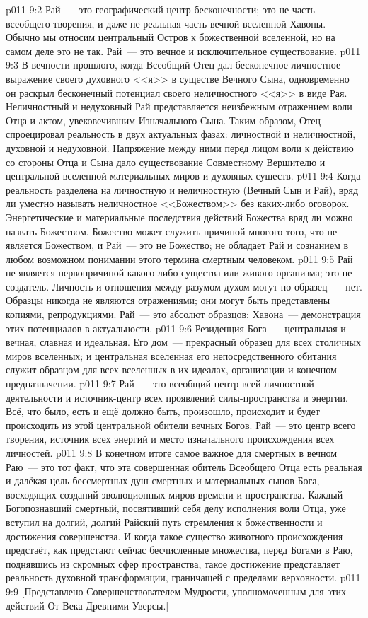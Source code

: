\vs p011 9:2 \pc Рай~--- это географический центр бесконечности; это не часть всеобщего творения, и даже не реальная часть вечной вселенной Хавоны. Обычно мы относим центральный Остров к божественной вселенной, но на самом деле это не так. Рай~--- это вечное и исключительное существование.
\vs p011 9:3 \pc В вечности прошлого, когда Всеобщий Отец дал бесконечное личностное выражение своего духовного <<я>> в существе Вечного Сына, одновременно он раскрыл бесконечный потенциал своего неличностного <<я>> в виде Рая. Неличностный и недуховный Рай представляется неизбежным отражением воли Отца и актом, увековечившим Изначального Сына. Таким образом, Отец спроецировал реальность в двух актуальных фазах: личностной и неличностной, духовной и недуховной. Напряжение между ними перед лицом воли к действию со стороны Отца и Сына дало существование Совместному Вершителю и центральной вселенной материальных миров и духовных существ.
\vs p011 9:4 Когда реальность разделена на личностную и неличностную (Вечный Сын и Рай), вряд ли уместно называть неличностное <<Божеством>> без каких\hyp{}либо оговорок. Энергетические и материальные последствия действий Божества вряд ли можно назвать Божеством. Божество может служить причиной многого того, что не является Божеством, и Рай~--- это не Божество; не обладает Рай и сознанием в любом возможном понимании этого термина смертным человеком.
\vs p011 9:5 \pc Рай не является первопричиной какого\hyp{}либо существа или живого организма; это не создатель. Личность и отношения между разумом\hyp{}духом могут  но образец~--- нет. Образцы никогда не являются отражениями; они могут быть представлены копиями, репродукциями. Рай~--- это абсолют образцов; Хавона~--- демонстрация этих потенциалов в актуальности.
\vs p011 9:6 \pc Резиденция Бога~--- центральная и вечная, славная и идеальная. Его дом~--- прекрасный образец для всех столичных миров вселенных; и центральная вселенная его непосредственного обитания служит образцом для всех вселенных в их идеалах, организации и конечном предназначении.
\vs p011 9:7 Рай~--- это всеобщий центр всей личностной деятельности и источник\hyp{}центр всех проявлений силы\hyp{}пространства и энергии. Всё, что было, есть и ещё должно быть, произошло, происходит и будет происходить из этой центральной обители вечных Богов. Рай~--- это центр всего творения, источник всех энергий и место изначального происхождения всех личностей.
\vs p011 9:8 \pc В конечном итоге самое важное для смертных в вечном Раю~--- это тот факт, что эта совершенная обитель Всеобщего Отца есть реальная и далёкая цель бессмертных душ смертных и материальных сынов Бога, восходящих созданий эволюционных миров времени и пространства. Каждый Богопознавший смертный, посвятивший себя делу исполнения воли Отца, уже вступил на долгий, долгий Райский путь стремления к божественности и достижения совершенства. И когда такое существо животного происхождения предстаёт, как предстают сейчас бесчисленные множества, перед Богами в Раю, поднявшись из скромных сфер пространства, такое достижение представляет реальность духовной трансформации, граничащей с пределами верховности.
\vsetoff
\vs p011 9:9 [Представлено Совершенствователем Мудрости, уполномоченным для этих действий От Века Древними Уверсы.]
\quizlink
